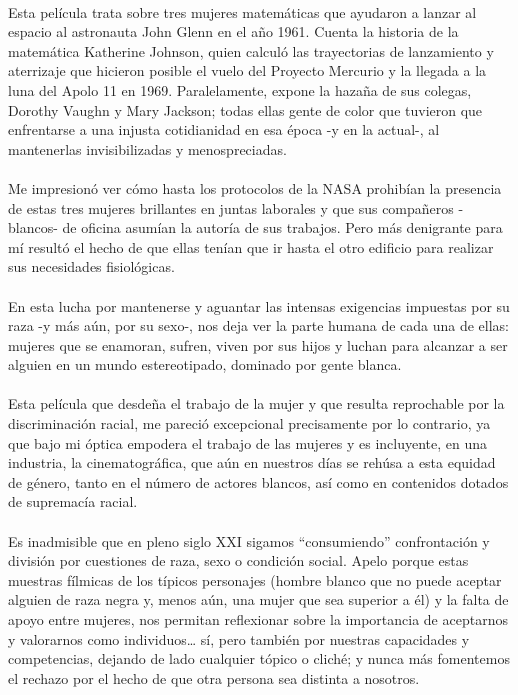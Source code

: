\documentclass[letterpaper,12pt]{article} %
\begin{document}
    \\
	Esta película trata sobre tres mujeres matemáticas que ayudaron a lanzar al espacio al astronauta John Glenn en el año 1961. Cuenta la historia de la matemática Katherine Johnson, quien calculó las trayectorias de lanzamiento y aterrizaje que hicieron posible el vuelo del Proyecto Mercurio y la llegada a la luna del Apolo 11 en 1969. Paralelamente, expone la hazaña de sus colegas, Dorothy Vaughn y Mary Jackson; todas ellas gente de color que tuvieron que enfrentarse a una injusta cotidianidad en esa época -y en la actual-, al mantenerlas invisibilizadas y menospreciadas. \\ \\
	Me impresionó ver cómo hasta los protocolos de la NASA prohibían la presencia de estas tres mujeres brillantes en juntas laborales y que sus compañeros -blancos- de oficina asumían la autoría de sus trabajos. Pero más denigrante para mí resultó el hecho de que ellas tenían que ir hasta el otro edificio para realizar sus necesidades fisiológicas. \\ \\
	En esta lucha por mantenerse y aguantar las intensas exigencias impuestas por su raza -y más aún, por su sexo-, nos deja ver la parte humana de cada una de ellas: mujeres que se enamoran, sufren, viven por sus hijos y luchan para alcanzar a ser alguien en un mundo estereotipado, dominado por gente blanca. \\ \\
	Esta película que desdeña el trabajo de la mujer y que resulta reprochable por la discriminación racial, me pareció excepcional precisamente por lo contrario, ya que bajo mi óptica empodera el trabajo de las mujeres y es incluyente, en una industria, la cinematográfica, que aún en nuestros días se rehúsa a esta equidad de género, tanto en el número de actores blancos, así como en contenidos dotados de supremacía racial. \\ \\
	Es inadmisible que en pleno siglo XXI sigamos “consumiendo” confrontación y división por cuestiones de raza, sexo o condición social. Apelo porque estas muestras fílmicas de los típicos personajes (hombre blanco que no puede aceptar alguien de raza negra y, menos aún, una mujer que sea superior a él) y la falta de apoyo entre mujeres, nos permitan reflexionar sobre la importancia de aceptarnos y valorarnos como individuos\dots{} sí, pero también por nuestras capacidades y competencias, dejando de lado cualquier tópico o cliché; y nunca más fomentemos el rechazo por el hecho de que otra persona sea distinta a nosotros.
\end{document}
